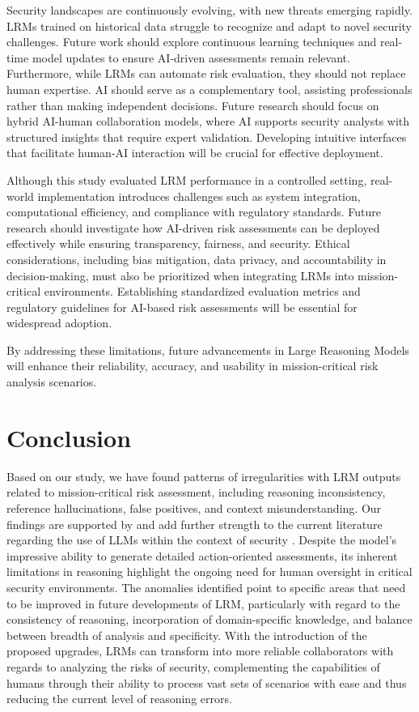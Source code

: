 \documentclass[sigconf]{acmart}
\begin{document}
Security landscapes are continuously evolving, with new threats emerging rapidly. LRMs trained on historical data struggle to recognize and adapt to novel security challenges. Future work should explore continuous learning techniques and real-time model updates to ensure AI-driven assessments remain relevant. Furthermore, while LRMs can automate risk evaluation, they should not replace human expertise. AI should serve as a complementary tool, assisting professionals rather than making independent decisions. Future research should focus on hybrid AI-human collaboration models, where AI supports security analysts with structured insights that require expert validation. Developing intuitive interfaces that facilitate human-AI interaction will be crucial for effective deployment.

Although this study evaluated LRM performance in a controlled setting, real-world implementation introduces challenges such as system integration, computational efficiency, and compliance with regulatory standards. Future research should investigate how AI-driven risk assessments can be deployed effectively while ensuring transparency, fairness, and security. Ethical considerations, including bias mitigation, data privacy, and accountability in decision-making, must also be prioritized when integrating LRMs into mission-critical environments. Establishing standardized evaluation metrics and regulatory guidelines for AI-based risk assessments will be essential for widespread adoption.

By addressing these limitations, future advancements in Large Reasoning Models will enhance their reliability, accuracy, and usability in mission-critical risk analysis scenarios.

\section{Conclusion}
Based on our study, we have found patterns of irregularities with LRM outputs related to mission-critical risk assessment, including reasoning inconsistency, reference hallucinations, false positives, and context misunderstanding. Our findings are supported by and add further strength to the current literature regarding the use of LLMs within the context of security \citep{esposito2024beyond}. Despite the model's impressive ability to generate detailed action-oriented assessments, its inherent limitations in reasoning highlight the ongoing need for human oversight in critical security environments. The anomalies identified point to specific areas that need to be improved in future developments of LRM, particularly with regard to the consistency of reasoning, incorporation of domain-specific knowledge, and balance between breadth of analysis and specificity. With the introduction of the proposed upgrades, LRMs can transform into more reliable collaborators with regards to analyzing the risks of security, complementing the capabilities of humans through their ability to process vast sets of scenarios with ease and thus reducing the current level of reasoning errors.


\appendix
\end{document}
